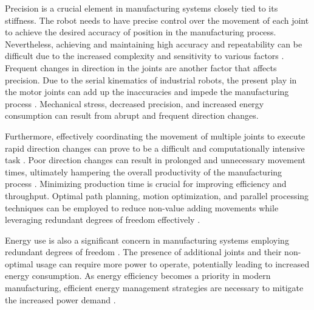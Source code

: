Precision is a crucial element in manufacturing systems closely tied to its stiffness. The robot needs to have precise control over the movement of each joint to achieve the desired accuracy of position in the manufacturing process. Nevertheless, achieving and maintaining high accuracy and repeatability can be difficult due to the increased complexity and sensitivity to various factors \cite{Duong.2021}. %
Frequent changes in direction in the joints are another factor that affects precision. 
Due to the serial kinematics of industrial robots, the present play in the motor joints can add up the inaccuracies and impede the manufacturing process \cite{Huynh.2020, ChenGang.2014}. Mechanical stress, decreased precision, and increased energy consumption can result from abrupt and frequent direction changes.

Furthermore, effectively coordinating the movement of multiple joints to execute rapid direction changes can prove to be a difficult and computationally intensive task \cite{VandeWeghe.2007}. Poor direction changes can result in prolonged and unnecessary movement times, ultimately hampering the overall productivity of the manufacturing process \cite{Reiter.2016}. %
Minimizing production time is crucial for improving efficiency and throughput. Optimal path planning, motion optimization, and parallel processing techniques can be employed to reduce non-value adding movements while leveraging redundant degrees of freedom effectively \cite{Boscariol.2020}.




Energy use is also a significant concern in manufacturing systems employing redundant degrees of freedom \cite{Doan.2016}. The presence of additional joints and their non-optimal usage can require more power to operate, potentially leading to increased energy consumption. As energy efficiency becomes a priority in modern manufacturing, efficient energy management strategies are necessary to mitigate the increased power demand \cite{Boscariol.2020, Boscariol.2019}. 


